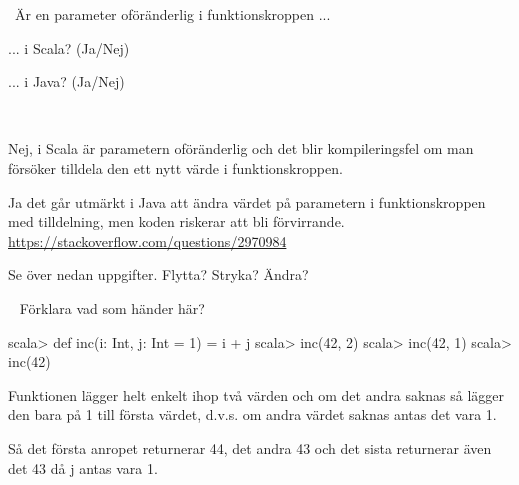 
\QUESTBEGIN

\Task \what~Är en parameter oföränderlig i funktionskroppen ...

\Subtask ... i Scala?  (Ja/Nej)

\Subtask ... i Java?  (Ja/Nej)


\SOLUTION

\TaskSolved \what~

\Subtask Nej, i Scala är parametern oföränderlig och det blir kompileringsfel om man försöker tilldela den ett nytt värde i funktionskroppen.

\Subtask Ja det går utmärkt i Java att ändra värdet på parametern i funktionskroppen med tilldelning, men koden riskerar att bli förvirrande.\\
\url{https://stackoverflow.com/questions/2970984}

\QUESTEND








\vspace{2em}\noindent\TODO Se över nedan uppgifter. Flytta? Stryka? Ändra?



\QUESTBEGIN

\Task  \what~  Förklara vad som händer här?

\begin{REPL}
scala> def inc(i: Int, j: Int = 1) = i + j
scala> inc(42, 2)
scala> inc(42, 1)
scala> inc(42)
\end{REPL}

\SOLUTION

\TaskSolved \what

Funktionen lägger helt enkelt ihop två värden och om det andra saknas så lägger den bara på 1 till första värdet, d.v.s. om andra värdet saknas antas det vara 1.

Så det första anropet returnerar 44, det andra 43 och det sista returnerar även det 43 då j antas vara 1.

\QUESTEND









\QUESTBEGIN

